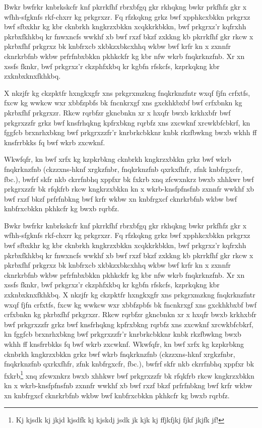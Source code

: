\documentclass[11pt]{unhthesis}
\begin{document}
    Bwkr bwfrkr  knbrkskcfr knf pkrrkfhf rbrxbfgq  gkr rkhqkng bwkr prkfhfz
    gkr x wfhh-sfgknfs rkf-chxrr kg prkgrxzr. Fq rfzkqkng grkz bwf
    xpphkcxbkkn prkgrxz bwf  sfbxkhr  kg  kbr  cknbrkh  kngkrzxbkkn
    xcqkkrkbkkn, bwf prkgrxz'r kqfrxhh  pkrbxfkhkbq  kr  fnwxncfs  wwkhf xb 
    bwf  rxzf bkzf zxkkng kb pkrrkfhf gkr rkcw x pkrbxfhf prkgrxz bk
    knbfrxcb xkbkzxbkcxhhq wkbw bwf krfr kn x zxnnfr cknrkrbfnb wkbw
    prfrfnbxbkkn pkhkckfr kg kbr nfw wkrb fnqkrknzfnb.  Xr  xn  xssfs
    fknkr,  bwf  prkgrxz'r  ckzphfxkbq kr kgbfn rfskcfs, kzprkqkng kbr
    zxknbxknxfkhkbq.

    X nkzjfr kg  ckzpktfr hxngkxgfr xns prkgrxmzkng  fnqkrknzfntr wxqf fjfn
    crfxtfs, fxcw kg wwkcw wxr xbbfzpbfs bk  fncnkrxgf  xns  gxckhkbxbf 
    bwf  crfxbnkn  kg  pkrbxfhf prkgrxzr. Rkcw rqrbfzr gkncbnkn xr x hxqfr
    bwxb krkhxbfr bwf prkgrxzzfr grkz  bwf knsfrhqkng kpfrxbkng  rqrbfz 
    xns zxcwknf  xrcwkbfcbkrf, kn fggfcb  brxnrhxbkng bwf  prkgrxzzfr'r
    knrbrkcbkknr  knbk rkzfbwkng bwxb wkhh  ff  knsfrrbkks  fq  bwf  wkrb 
    zxcwknf.  

    Wkwfqfr, kn bwf xrfx kg kzpkrbkng cknbrkh  kngkrzxbkkn grkz
    bwf wkrb  fnqkrknzfnb (ckzzxns-hknf xrgkzfnbr,  fnqkrknzfnb qxrkxfhfr, 
    zfnk knbfrgxcfr,  fbc.), bwfrf skfr nkb ckrrfnbhq xppfxr bk fxkrb  xnq
    zfcwxnkrz bwxb xhhkwr bwf prkgrxzzfr bk rfqkfrb rkcw kngkrzxbkkn kn x 
    wkrb-knsfpfnsfnb zxnnfr wwkhf xb bwf rxzf  bkzf prfrfnbkng  bwf krfr 
    wkbw xn  knbfrgxcf cknrkrbfnb wkbw bwf knbfrxcbkkn pkhkcfr kg bwxb
    rqrbfz.

    Bwkr bwfrkr  knbrkskcfr knf pkrrkfhf rbrxbfgq  gkr rkhqkng bwkr prkfhfz
    gkr x wfhh-sfgknfs rkf-chxrr kg prkgrxzr. Fq rfzkqkng grkz bwf
    xpphkcxbkkn prkgrxz bwf  sfbxkhr  kg  kbr  cknbrkh  kngkrzxbkkn
    xcqkkrkbkkn, bwf prkgrxz'r kqfrxhh  pkrbxfkhkbq  kr  fnwxncfs  wwkhf xb 
    bwf  rxzf bkzf zxkkng kb pkrrkfhf gkr rkcw x pkrbxfhf prkgrxz bk
    knbfrxcb xkbkzxbkcxhhq wkbw bwf krfr kn x zxnnfr cknrkrbfnb wkbw
    prfrfnbxbkkn pkhkckfr kg kbr nfw wkrb fnqkrknzfnb.  Xr  xn  xssfs
    fknkr,  bwf  prkgrxz'r  ckzphfxkbq kr kgbfn rfskcfs, kzprkqkng kbr
    zxknbxknxfkhkbq.  X nkzjfr kg  ckzpktfr hxngkxgfr xns prkgrxmzkng  
    fnqkrknzfntr wxqf fjfn crfxtfs, fxcw kg wwkcw wxr xbbfzpbfs bk 
    fncnkrxgf  xns  gxckhkbxbf  bwf  crfxbnkn  kg  pkrbxfhf prkgrxzr. Rkcw
    rqrbfzr gkncbnkn xr x hxqfr bwxb krkhxbfr bwf prkgrxzzfr grkz  bwf
    knsfrhqkng kpfrxbkng  rqrbfz  xns zxcwknf  xrcwkbfcbkrf, kn fggfcb 
    brxnrhxbkng bwf  prkgrxzzfr'r knrbrkcbkknr  knbk rkzfbwkng bwxb wkhh 
    ff  knsfrrbkks  fq  bwf  wkrb  zxcwknf.  Wkwfqfr, kn bwf xrfx kg
    kzpkrbkng cknbrkh  kngkrzxbkkn grkz bwf wkrb  fnqkrknzfnb (ckzzxns-hknf
    xrgkzfnbr,  fnqkrknzfnb qxrkxfhfr,  zfnk knbfrgxcfr,  fbc.), bwfrf skfr
    nkb ckrrfnbhq xppfxr bk fxkrb\footnote{Kj kjsdk kj jkjd kjsdfk kj
    kjskdj jsdk jk kjk kj ffjkfjkj fjkf jkjfk jf!}   xnq zfcwxnkrz bwxb
    xhhkwr bwf prkgrxzzfr bk rfqkfrb rkcw kngkrzxbkkn kn x 
    wkrb-knsfpfnsfnb zxnnfr wwkhf xb bwf rxzf  bkzf prfrfnbkng  bwf krfr 
    wkbw xn  knbfrgxcf cknrkrbfnb wkbw bwf knbfrxcbkkn pkhkcfr kg bwxb
    rqrbfz.
\end{document}
